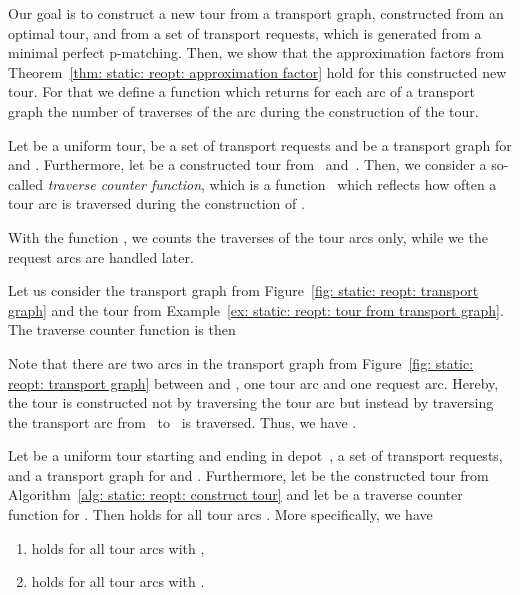 \documentclass[english]{llncs}
\numberwithin{sublemma}{lemma}
\begin{document}
Our goal is to construct a new tour from a transport graph, constructed from an optimal tour, and from a set of transport requests, which is generated from a minimal perfect p-matching.
Then, we show that the approximation factors from Theorem~\ref{thm: static: reopt: approximation factor} hold for this constructed new tour.
For that we define a function which returns for each arc of a transport graph the number of traverses of the arc during the construction of the tour.


Let  be a uniform tour,  be a set of transport requests and  be a transport graph for  and .
Furthermore, let  be a constructed tour from~ and~.
Then, we consider a so-called \emph{traverse counter function}, which is a function~ which reflects how often a tour arc  is traversed during the construction of .

With the function , we counts the traverses of the tour arcs only, while we the request arcs are handled later.


\begin{example}
\label{ex: static: reopt: traverse counter function}
Let us consider the transport graph from Figure~\ref{fig: static: reopt: transport graph} 
and the tour  from Example~\ref{ex: static: reopt: tour from transport graph}.
The traverse counter function  is then

Note that there are two arcs in the transport graph from Figure~\ref{fig: static: reopt: transport graph} between  and , one tour arc and one request arc.
Hereby, the tour  is constructed not by traversing the tour arc 
but instead by traversing the transport arc from~ to~ is traversed.
Thus, we have .
\end{example}




\begin{lemma}
\label{lem: static: reopt: f leq c plus 1}
  Let  be a uniform tour starting and ending in depot~,  a set of transport requests, and  a transport graph for  and .
  Furthermore, let  be the constructed tour from Algorithm~\ref{alg: static: reopt: construct tour} and let  be a traverse counter function for .
  Then  holds for all tour arcs .
  More specifically, we have
  \begin{enumerate}
   \item \label{lem: static: reopt: f leq c plus 1: 1}  holds for all tour arcs  with ,
   \item \label{lem: static: reopt: f leq c plus 1: 2}  holds for all tour arcs  with .
  \end{enumerate}
\end{lemma}
\end{document}
